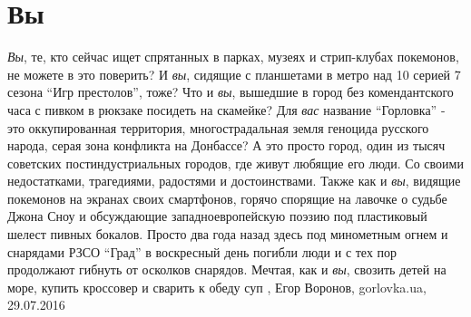  
 
 
 
 
\chapter{Вы}
\label{sec:slova.vy}

\emph{Вы}, те, кто сейчас ищет спрятанных в парках, музеях и стрип-клубах покемонов,
не можете в это поверить? И \emph{вы}, сидящие с планшетами в метро над 10 серией 7
сезона \enquote{Игр престолов}, тоже? Что и \emph{вы}, вышедшие в город без комендантского
часа с пивком в рюкзаке посидеть на скамейке? Для \emph{вас} название \enquote{Горловка} - это
оккупированная территория, многострадальная земля геноцида русского народа,
серая зона конфликта на Донбассе? А это просто город, один из тысяч советских
постиндустриальных городов, где живут любящие его люди. Со своими недостатками,
трагедиями, радостями и достоинствами. Также как и \emph{вы}, видящие покемонов на
экранах своих смартфонов, горячо спорящие на лавочке о судьбе Джона Сноу и
обсуждающие западноевропейскую поэзию под пластиковый шелест пивных бокалов.
Просто два года назад здесь под минометным огнем и снарядами РЗСО \enquote{Град} в
воскресный день погибли люди и с тех пор продолжают гибнуть от осколков
снарядов. Мечтая, как и \emph{вы}, свозить детей на море, купить кроссовер и сварить к
обеду суп
, 
Егор Воронов, gorlovka.ua, 29.07.2016

